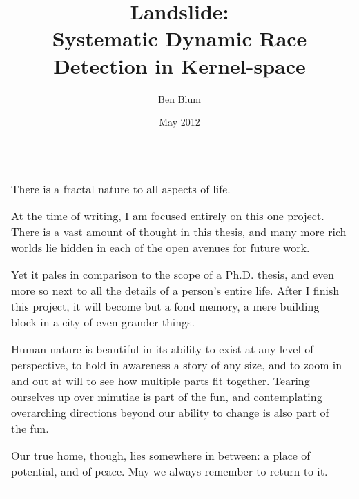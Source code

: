 \pagestyle{empty}

\title{\bf Landslide: \\
  Systematic Dynamic Race Detection in Kernel-space}
\author{Ben Blum}
\date{May 2012}






\maketitle

\begin{dedication}
\begin{tabular}{p{6in}}
\centering
There is a fractal nature to all aspects of life.

At the time of writing, I am focused entirely on this one project. There is a vast amount of thought in this thesis, and many more rich worlds lie hidden in each of the open avenues for future work.

Yet it pales in comparison to the scope of a Ph.D. thesis, and even more so next to all the details of a person's entire life.
After I finish this project, it will become but a fond memory, a mere building block in a city of even grander things.

Human nature is beautiful in its ability to exist at any level of perspective, to hold in awareness a story of any size, and to zoom in and out at will to see how multiple parts fit together.
Tearing ourselves up over minutiae is part of the fun, and contemplating overarching directions beyond our ability to change is also part of the fun.

Our true home, though, lies somewhere in between: a place of potential, and of peace. May we always remember to return to it.
\end{tabular}
\end{dedication}

\pagestyle{plain} %
